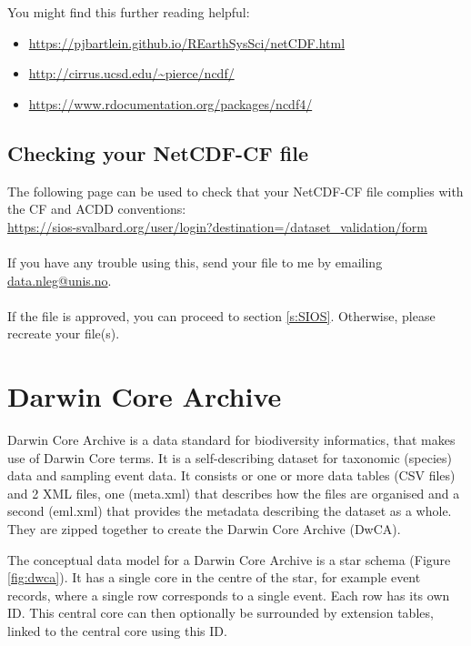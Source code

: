 \documentclass[a4paper,english, 11pt]{article}
\makeatletter
\newcommand{\emailme}{\href{mailto:data.nleg@unis.no}{data.nleg@unis.no}}
\makeatother
\begin{document}
You might find this further reading helpful:
\begin{itemize}
\item \url{https://pjbartlein.github.io/REarthSysSci/netCDF.html}
\item \url{http://cirrus.ucsd.edu/~pierce/ncdf/}
\item \url{https://www.rdocumentation.org/packages/ncdf4/}
\end{itemize}


\subsection{Checking your NetCDF-CF file}
\label{ss:netcdf_checker}

The following page can be used to check that your NetCDF-CF file complies with the CF and ACDD conventions: \\

\url{https://sios-svalbard.org/user/login?destination=/dataset_validation/form} \\ \\If you have any trouble using this, send your file to me by emailing \emailme .
\\ \\
If the file is approved, you can proceed to section \ref{s:SIOS}. Otherwise, please recreate your file(s). 

\newpage

\section{Darwin Core Archive}
\label{s:DwCA}

Darwin Core Archive is a data standard for biodiversity informatics, that makes use of Darwin Core terms. It is a self-describing dataset for taxonomic (species) data and sampling event data. It consists or one or more data tables (CSV files) and 2 XML files, one (meta.xml) that describes how the files are organised and a second  (eml.xml) that provides the metadata describing the dataset as a whole. They are zipped together to create the Darwin Core Archive (DwCA).

The conceptual data model for a Darwin Core Archive is a star schema (Figure \ref{fig:dwca}). 
It has a single core in the centre of the star, for example event records, where a single row corresponds to a single event. 
Each row has its own ID.  
This central core can then optionally be surrounded by extension tables, linked to the central core using this ID.
\end{document}

